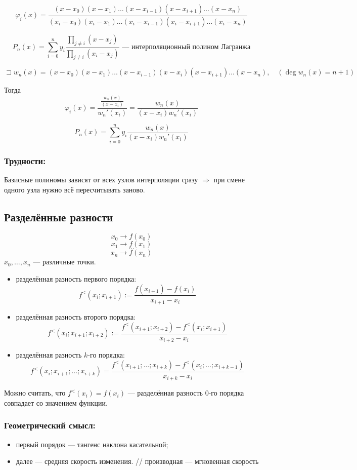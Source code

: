 \[
\varphi_i(x) = \frac{(x - x_0)(x - x_1) \ldots (x - x_{i-1})(x - x_{i+1}) \ldots (x - x_n)}{(x_i - x_0)(x_i - x_1) \ldots (x_i - x_{i-1})(x_i - x_{i+1}) \ldots (x_i - x_n)}
\]

\[
P_n(x) = \sum_{i=0}^n y_i \frac{\prod_{j \neq i} (x - x_j)}{\prod_{j \neq i} (x_i - x_j)} \text{ --- интерполяционный полином Лагранжа}
\]

\[
\sqsupset w_n(x) = (x - x_0)(x - x_1) \ldots (x - x_{i-1})(x - x_i)(x - x_{i+1}) \ldots (x - x_n), \quad (\deg w_n(x) = n + 1)
\]

Тогда
\[
\varphi_i(x) = \frac{ \frac{w_n(x)}{(x - x_i)}}{w_n'(x_i)} = \frac{w_n(x)}{(x - x_i)w_n'(x_i)}
\]

\[
P_n(x) = \sum_{i=0}^n y_i \frac{w_n(x)}{(x - x_i)w_n'(x_i)}
\]

\subsubsection*{Трудности:} Базисные полиномы зависят от всех узлов интерполяции сразу $\Rightarrow$ при смене одного узла нужно всё пересчитывать заново.

\subsection*{Разделённые разности}

\[ x_0 \to f(x_0) \]
\[ x_1 \to f(x_1) \]
\[ \ldots \]
\[ x_n \to f(x_n) \]
$x_0, \ldots, x_n$ --- различные точки.

\begin{itemize}
    \item разделённая разность первого порядка:
\[
f^{<}(x_i; x_{i+1}) := \frac{f(x_{i+1}) - f(x_i)}{x_{i+1} - x_i}
\]
    \item разделённая разность второго порядка:
\[
f^{<}(x_i; x_{i+1}; x_{i+2}) := \frac{f^{<}(x_{i+1}; x_{i+2}) - f^{<}(x_i; x_{i+1})}{x_{i+2} - x_i}
\]
    \item разделённая разность $k$-го порядка:
\[
f^{<}(x_i; x_{i+1}; \ldots; x_{i+k}) = \frac{f^{<}(x_{i+1}; \ldots; x_{i+k}) - f^{<}(x_i; \ldots; x_{i+k-1})}{x_{i+k} - x_i}
\]
\end{itemize}

Можно считать, что $f^{<}(x_i) = f(x_i)$ --- разделённая разность 0-го порядка совпадает со значением функции. 

\subsubsection*{Геометрический смысл:}
\begin{itemize}
    \item первый порядок --- тангенс наклона касательной;
    \item далее --- средняя скорость изменения. \quad // производная --- мгновенная скорость
\end{itemize}

